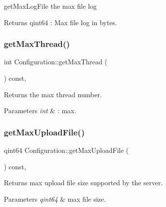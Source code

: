 get\+Max\+Log\+File the max file log 

\begin{DoxyReturn}{Returns}
qint64 \+: Max file log in bytes. 
\end{DoxyReturn}
\mbox{\label{class_configuration_a1adc08d559e9e7209dfd73c436c27288}} 
\subsubsection{\texorpdfstring{get\+Max\+Thread()}{getMaxThread()}}
{\footnotesize\ttfamily int Configuration\+::get\+Max\+Thread (\begin{DoxyParamCaption}{ }\end{DoxyParamCaption}) const\hspace{0.3cm}{\ttfamily [inline]}, {\ttfamily [noexcept]}}



Returns the max thread number. 


\begin{DoxyParams}{Parameters}
{\em int} & \+: max. \\
\hline
\end{DoxyParams}
\mbox{\label{class_configuration_a6366d5802568dca07d4a633110f07863}} 
\subsubsection{\texorpdfstring{get\+Max\+Upload\+File()}{getMaxUploadFile()}}
{\footnotesize\ttfamily qint64 Configuration\+::get\+Max\+Upload\+File (\begin{DoxyParamCaption}{ }\end{DoxyParamCaption}) const\hspace{0.3cm}{\ttfamily [inline]}, {\ttfamily [noexcept]}}



Returns max upload file size supported by the server. 


\begin{DoxyParams}{Parameters}
{\em qint64} & max file size. \\
\hline
\end{DoxyParams}
\mbox{\label{class_configuration_ae8a0a39c01183a3ffa8d5e1511a2a883}} 
